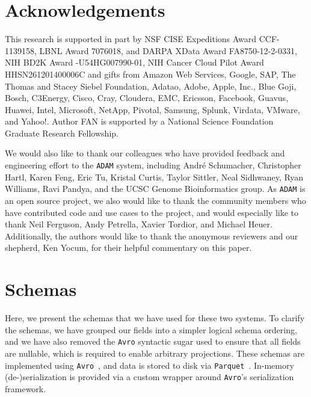 \documentclass{sig-alternate}
\begin{document}
\section{Acknowledgements}

This research is supported in part by NSF CISE Expeditions Award CCF-1139158, LBNL Award 7076018, and DARPA XData Award FA8750-12-2-0331, NIH BD2K Award -U54HG007990-01, NIH Cancer Cloud Pilot Award \linebreak HHSN261201400006C and gifts from Amazon Web Services, Google, SAP,  The Thomas and Stacey Siebel Foundation, Adatao, Adobe, Apple, Inc., Blue Goji, Bosch, C3Energy, Cisco, Cray, Cloudera, EMC, Ericsson, Facebook, Guavus, Huawei, Intel, Microsoft, NetApp, Pivotal, Samsung, Splunk, Virdata, VMware, and Yahoo!. Author FAN is supported by a National Science Foundation Graduate Research Fellowship.

We would also like to thank our colleagues who have provided feedback and engineering effort to the \texttt{ADAM} system, including Andr\'{e} Schumacher, Christopher Hartl, Karen Feng, Eric Tu, Kristal Curtis, Taylor Sittler, Neal Sidhwaney, Ryan Williams, Ravi Pandya, and the UCSC Genome Bioinformatics group. As \texttt{ADAM} is an open source project, we also would like to thank the community members who have contributed code and use cases to the project, and would especially like to thank Neil Ferguson, Andy Petrella, Xavier Tordior, and Michael Heuer. Additionally, the authors would like to thank the anonymous reviewers and our shepherd, Ken Yocum, for their helpful commentary on this paper.

\balance

\clearpage

\appendix




\section{Schemas}
\label{sec:schema}

Here, we present the schemas that we have used for these two systems. To clarify the schemas, we
have grouped our fields into a simpler logical schema ordering, and we have also removed the \texttt{Avro} syntactic
sugar used to ensure that all fields are nullable, which is required to enable arbitrary
projections. These schemas are implemented using \texttt{Avro}~\cite{avro}, and data is stored to disk via
\texttt{Parquet}~\cite{parquet}. In-memory \linebreak (de-)serialization is provided via a custom wrapper around
\texttt{Avro}'s serialization framework.
\end{document}
